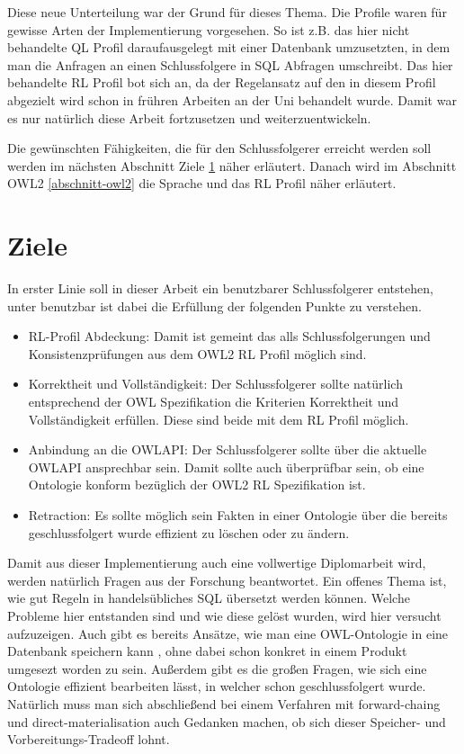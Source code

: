 Diese neue Unterteilung war der Grund für dieses Thema. Die Profile waren für gewisse Arten der Implementierung vorgesehen. So ist z.B. das hier nicht behandelte QL Profil daraufausgelegt mit einer Datenbank umzusetzten, in dem man die Anfragen an einen Schlussfolgere in SQL Abfragen umschreibt. Das hier behandelte RL Profil bot sich an, da der Regelansatz auf den in diesem Profil abgezielt wird schon in frühren Arbeiten an der Uni behandelt wurde. Damit war es nur natürlich diese Arbeit fortzusetzen und weiterzuentwickeln.

Die gewünschten Fähigkeiten, die für den Schlussfolgerer erreicht werden soll werden im nächsten Abschnitt Ziele \ref{abschnitt-ziele} näher erläutert. Danach wird im Abschnitt OWL2 \ref{abschnitt-owl2} die Sprache und das RL Profil näher erläutert.

\section{Ziele}
\label{abschnitt-ziele}

In erster Linie soll in dieser Arbeit ein benutzbarer Schlussfolgerer entstehen, unter benutzbar ist dabei die Erfüllung der folgenden Punkte zu verstehen.

\begin{itemize}
  \item RL-Profil Abdeckung: Damit ist gemeint das alls Schlussfolgerungen und Konsistenzprüfungen aus dem OWL2 RL Profil möglich sind.
  \item Korrektheit und Vollständigkeit: Der Schlussfolgerer sollte natürlich entsprechend der OWL Spezifikation die Kriterien Korrektheit und Vollständigkeit erfüllen. Diese sind beide mit dem RL Profil möglich.
  \item Anbindung an die OWLAPI: Der Schlussfolgerer sollte über die aktuelle OWLAPI ansprechbar sein. Damit sollte auch überprüfbar sein, ob eine Ontologie konform bezüglich der OWL2 RL Spezifikation ist.
  \item Retraction: Es sollte möglich sein Fakten in einer Ontologie über die bereits geschlussfolgert wurde effizient zu löschen oder zu ändern.
\end{itemize}

Damit aus dieser Implementierung auch eine vollwertige Diplomarbeit wird, werden natürlich Fragen aus der Forschung beantwortet. Ein offenes Thema ist, wie gut Regeln in handelsübliches SQL übersetzt werden können. Welche Probleme hier entstanden sind und wie diese gelöst wurden, wird hier versucht aufzuzeigen. Auch gibt es bereits Ansätze, wie man eine OWL-Ontologie in eine Datenbank speichern kann \cite{Kleb2009OWLDB}, ohne dabei schon konkret in einem Produkt umgesezt worden zu sein. Außerdem gibt es die großen Fragen, wie sich eine Ontologie effizient bearbeiten lässt, in welcher schon geschlussfolgert wurde. Natürlich muss man sich abschließend bei einem Verfahren mit forward-chaing und direct-materialisation auch Gedanken machen, ob sich dieser Speicher- und Vorbereitungs-Tradeoff lohnt.

